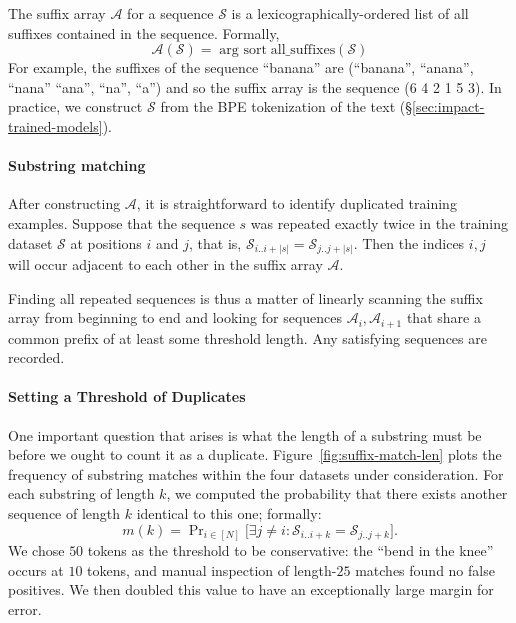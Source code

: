 The suffix array $\mathcal{A}$ for a sequence $\mathcal{S}$ is a lexicographically-ordered list of all suffixes contained in the sequence. 
%
Formally,
\[ \mathcal{A}(\mathcal{S}) = \mathop{\text{arg sort}} \text{all\_suffixes}(\mathcal{S}) \]
%
For example, the suffixes of the sequence ``banana'' are (``banana'',  ``anana'', ``nana'' ``ana'', ``na'', ``a'')
and so the suffix array is the sequence (6 4 2 1 5 3).
In practice, we construct $\mathcal{S}$ from the BPE tokenization of the text (\S\ref{sec:impact-trained-models}).




\paragraph{Substring matching}

After constructing $\mathcal{A}$, it is straightforward to identify duplicated training examples.
Suppose that the sequence $s$ was repeated exactly twice in the training dataset $\mathcal{S}$ at positions $i$ and $j$,
that is, $\mathcal{S}_{i..i+|s|} = \mathcal{S}_{j..j+|s|}$.
%
Then the indices $i, j$ will occur adjacent to each other in the suffix array $\mathcal{A}$.

Finding all repeated sequences is thus a matter of linearly scanning the suffix array from
beginning to end and looking for sequences $\mathcal{A}_i, \mathcal{A}_{i+1}$ that share a common prefix of
at least some threshold length.
%
Any satisfying sequences are recorded.
%

\paragraph{Setting a Threshold of Duplicates}
\label{section:exact_thresh}
One important question that arises is what the length of a substring must be before we ought to count it as a duplicate.
%
Figure~\ref{fig:suffix-match-len} plots the frequency of substring matches within the four datasets under consideration.
For each substring of length $k$, we computed the probability that there exists another sequence of length $k$ identical to this one; formally:
\[m(k) = \mathop{\text{Pr}}_{i \in [N]}\big[ \exists j \ne i : \mathcal{S}_{i..i+k} = \mathcal{S}_{j..j+k}\big].\]
We chose $50$ tokens as the threshold to be conservative:
the ``bend in the knee'' occurs at $10$ tokens, and manual inspection of
length-$25$ matches found no false positives.
We then doubled this value to have an exceptionally large margin for error.

